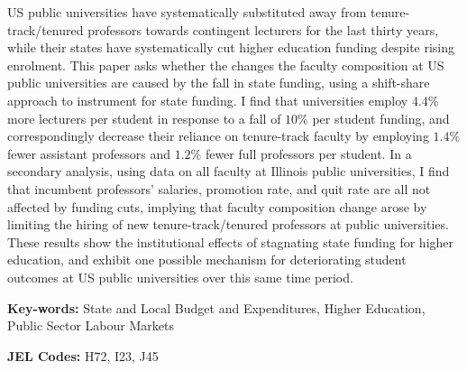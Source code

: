 US public universities have systematically substituted away from tenure-track/tenured professors towards contingent lecturers for the last thirty years, while their states have systematically cut higher education funding despite rising enrolment.
This paper asks whether the changes the faculty composition at US public universities are caused by the fall in state funding, using a shift-share approach to instrument for state funding.
I find that universities employ $4.4$\% more lecturers per student in response to a fall of $10$\% per student funding, and correspondingly decrease their reliance on tenure-track faculty by employing $1.4$\% fewer assistant professors and $1.2$\% fewer full professors per student.
In a secondary analysis, using data on all faculty at Illinois public universities, I find that incumbent professors' salaries, promotion rate, and quit rate are all not affected by funding cuts, implying that faculty composition change arose by limiting the hiring of new tenure-track/tenured professors at public universities.
These results show the institutional effects of stagnating state funding for higher education, and exhibit one possible mechanism for deteriorating student outcomes at US public universities over this same time period.

\vfill
\noindent
\textbf{Key-words:}
State and Local Budget and Expenditures,
Higher Education,
Public Sector Labour Markets

\vspace{0.05cm}
\noindent
\textbf{JEL Codes:} H72, I23, J45
